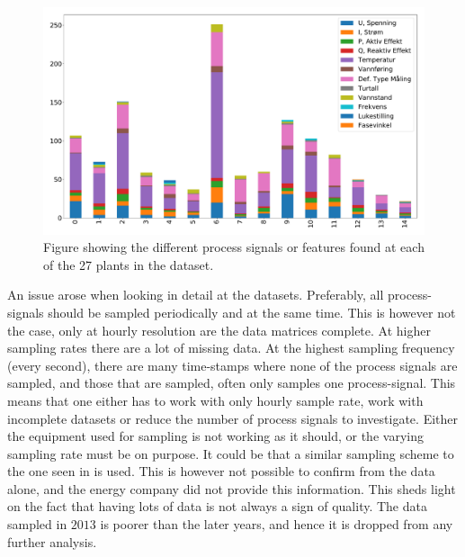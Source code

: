         \begin{figure}
            \centering
            \includegraphics[width=\textwidth]{report/figures/data/plant_signal_types_overview.pdf}
            \caption{Figure showing the different process signals or features found at each of the 27 plants in the dataset.}
            \label{fig:signal_type_overview}
        \end{figure}
        
        
        
        An issue arose when looking in detail at the datasets. Preferably, all process-signals should be sampled periodically and at the same time. This is however not the case, only at hourly resolution are the data matrices complete. At higher sampling rates there are a lot of missing data. At the highest sampling frequency (every second), there are many time-stamps where none of the process signals are sampled, and those that are sampled, often only samples one process-signal. This means that one either has to work with only hourly sample rate, work with incomplete datasets or reduce the number of process signals to investigate. Either the equipment used for sampling is not working as it should, or the varying sampling rate must be on purpose. It could be that a similar sampling scheme to the one seen in \cite{Selak2014} is used. This is however not possible to confirm from the data alone, and the energy company did not provide this information. This sheds light on the fact that having lots of data is not always a sign of quality. The data sampled in $2013$ is poorer than the later years, and hence it is dropped from any further analysis. 
        
